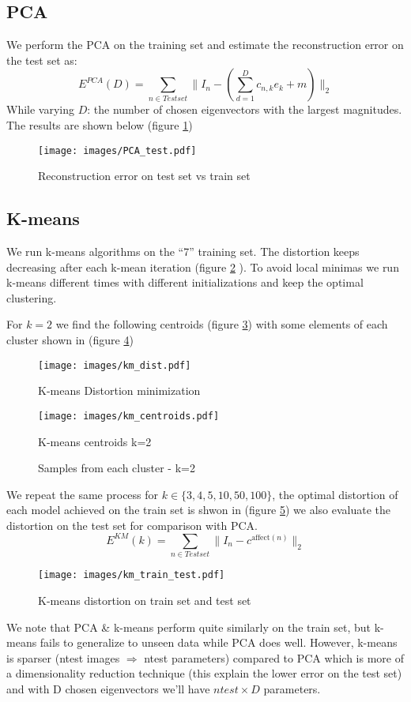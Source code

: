 \documentclass[11pt]{article}
\theoremstyle{exo}
\newcommand{\1}{\mathbbm{1}}
\begin{document}
	\subsection{PCA}
		We perform the PCA on the training set and estimate the reconstruction error on the test set as:
		\[E^{PCA}(D)=\sum_{n\in Testset}\|I_n-\left(\sum\limits_{d=1}^Dc_{n,k}e_k+m\right)\|_2\]
		While varying $D$: the number of chosen eigenvectors with the largest magnitudes.
		The results are shown below (figure \ref{PCA})
		\begin{figure}[H]
			\centering
			\caption{Reconstruction error on test set vs train set\label{PCA}}
			\texttt{[image: images/PCA\_test.pdf]}
		\end{figure}

	\subsection{K-means}
		We run k-means algorithms on the ``7'' training set. The distortion keeps decreasing after each k-mean iteration (figure \ref{dstr} ). To avoid local minimas we run k-means different times with different initializations and keep the optimal clustering.

		For $k=2$ we find the following centroids (figure \ref{centroids}) with some elements of each cluster shown in (figure \ref{sample})
		\begin{figure}[H]
			\centering
			\caption{K-means Distortion minimization\label{dstr}}
			\texttt{[image: images/km\_dist.pdf]}
		\end{figure}

		\begin{figure}[H]
			\centering
			\caption{K-means centroids k=2\label{centroids}}
			\texttt{[image: images/km\_centroids.pdf]}
		\end{figure}
		\begin{figure}[H]
			\centering
			\caption{Samples from each cluster - k=2\label{sample}}
		\end{figure}
		We repeat the same process for $k\in\{3,4,5,10,50,100\}$, the optimal distortion of each model achieved on the train set is shwon in (figure \ref{dist}) we also evaluate the distortion on the test set for comparison with PCA.
		\[E^{KM}(k)=\sum_{n\in Testset}\|I_n-c^{\text{affect}(n)}\|_2\]
		\begin{figure}[H]
			\centering
			\caption{K-means distortion on train set and test set\label{dist}}
			\texttt{[image: images/km\_train\_test.pdf]}
		\end{figure}
		We note that PCA \& k-means perform quite similarly on the train set, but k-means fails to generalize to unseen data while PCA does well. However, k-means is sparser (ntest images $\Rightarrow$ ntest parameters) compared to PCA which is more of a dimensionality reduction technique (this explain the lower error on the test set) and with D chosen eigenvectors we'll have $ntest\times D$ parameters.
\end{document}
